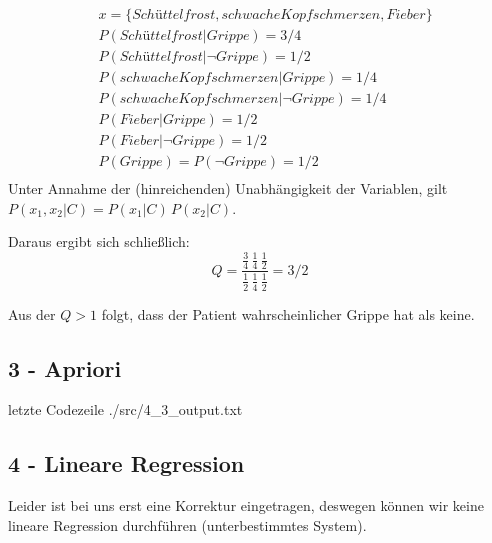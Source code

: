 \begin{align*}
& x = \{Schüttelfrost, schwache Kopfschmerzen, Fieber\} \\
& P(Schüttelfrost|Grippe) = 3/4 \\
& P(Schüttelfrost|\neg Grippe) = 1/2 \\
& P(schwache Kopfschmerzen|Grippe) = 1/4 \\
& P(schwache Kopfschmerzen|\neg Grippe) = 1/4 \\
& P(Fieber|Grippe) = 1/2 \\
& P(Fieber|\neg Grippe) = 1/2 \\
& P(Grippe) = P(\neg Grippe) = 1/2 \\
\end{align*}
Unter Annahme der (hinreichenden) Unabhängigkeit der Variablen, gilt $P(x_1, x_2 |C) = P(x_1|C)\, P(x_2|C)$.

Daraus ergibt sich schließlich:
\begin{equation*}
Q = \frac{\frac{3}{4} \, \frac{1}{4}\, \frac{1}{2}}{\frac{1}{2} \, \frac{1}{4}\, \frac{1}{2}} = 3/2
\end{equation*}

Aus der $Q > 1$ folgt, dass der Patient wahrscheinlicher Grippe hat als keine.

\subsection*{3 - Apriori}
 letzte Codezeile
{./src/4_3_output.txt}

\subsection*{4 - Lineare Regression}
Leider ist bei uns erst eine Korrektur eingetragen, deswegen können wir keine lineare Regression durchführen (unterbestimmtes System).

\printbibliography %


